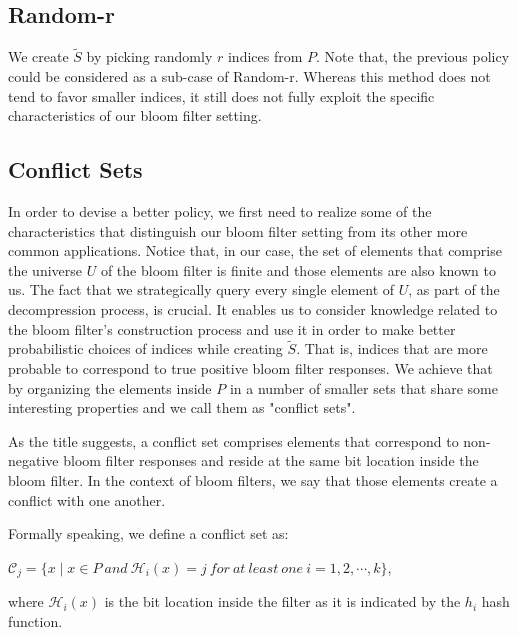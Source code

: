      
        \subsection{Random-r}
            We create $\tilde{S}$ by picking randomly $r$ indices from $P$.
            Note that, the previous policy could be considered as a sub-case of Random-r. Whereas this method does not tend to favor smaller indices, it still does not fully exploit the specific characteristics of our bloom filter setting.
        
        \subsection{Conflict Sets}
            In order to devise a better policy, we first need to realize some of the characteristics that distinguish our bloom filter setting from its other more common applications.
            Notice that, in our case, the set of elements that comprise the universe $U$ of the bloom filter is finite and those elements are also known to us.
            The fact that we strategically query every single element of $U$, as part of the decompression process, is crucial.
            It enables us to consider knowledge related to the bloom filter's construction process and use it in order to make better probabilistic choices of indices while creating $\tilde{S}$.
            That is, indices that are more probable to correspond to true positive bloom filter responses.
            We achieve that by organizing the elements inside $P$ in a number of smaller sets that share some interesting properties and we call them as "conflict sets".
            
            As the title suggests, a conflict set comprises elements that correspond to non-negative bloom filter responses and reside at the same bit location inside the bloom filter. In the context of bloom filters, we say that those elements create a conflict with one another.
            
            Formally speaking, we define a conflict set as:
            \begin{flushleft}
            $ \mathcal{C}_j = \{x \mid x \in P\ and\ \mathcal{H}_i(x)=j\ for\ at\ least\ one\ i=1,2,\cdots,k \}$, 
            
            where $\mathcal{H}_i(x)$ is the bit location inside the filter as it is indicated by the $h_i$ hash function.
            \end{flushleft}
            
